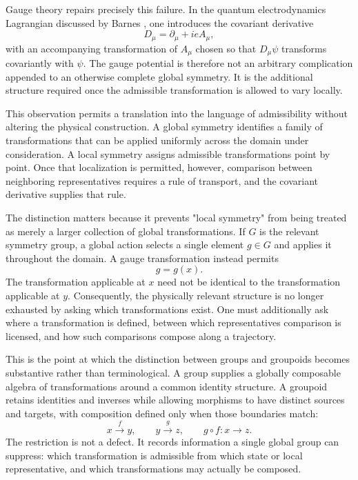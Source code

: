 \documentclass[11pt]{article}
\begin{document}
Gauge theory repairs precisely this failure. In the quantum electrodynamics Lagrangian discussed by Barnes \cite{Barnes2010}, one introduces the covariant derivative
\[
D_\mu = \partial_\mu + ieA_\mu,
\]
with an accompanying transformation of $A_\mu$ chosen so that $D_\mu\psi$ transforms covariantly with $\psi$. The gauge potential is therefore not an arbitrary complication appended to an otherwise complete global symmetry. It is the additional structure required once the admissible transformation is allowed to vary locally.

This observation permits a translation into the language of admissibility without altering the physical construction. A global symmetry identifies a family of transformations that can be applied uniformly across the domain under consideration. A local symmetry assigns admissible transformations point by point. Once that localization is permitted, however, comparison between neighboring representatives requires a rule of transport, and the covariant derivative supplies that rule.

The distinction matters because it prevents "local symmetry" from being treated as merely a larger collection of global transformations. If $G$ is the relevant symmetry group, a global action selects a single element $g \in G$ and applies it throughout the domain. A gauge transformation instead permits
\[
g = g(x).
\]
The transformation applicable at $x$ need not be identical to the transformation applicable at $y$. Consequently, the physically relevant structure is no longer exhausted by asking which transformations exist. One must additionally ask where a transformation is defined, between which representatives comparison is licensed, and how such comparisons compose along a trajectory.

This is the point at which the distinction between groups and groupoids becomes substantive rather than terminological. A group supplies a globally composable algebra of transformations around a common identity structure. A groupoid \cite{Mackenzie1987,Brown2006} retains identities and inverses while allowing morphisms to have distinct sources and targets, with composition defined only when those boundaries match:
\[
x \xrightarrow{f} y, \qquad y \xrightarrow{g} z, \qquad g \circ f : x \rightarrow z.
\]
The restriction is not a defect. It records information a single global group can suppress: which transformation is admissible from which state or local representative, and which transformations may actually be composed.
\end{document}
